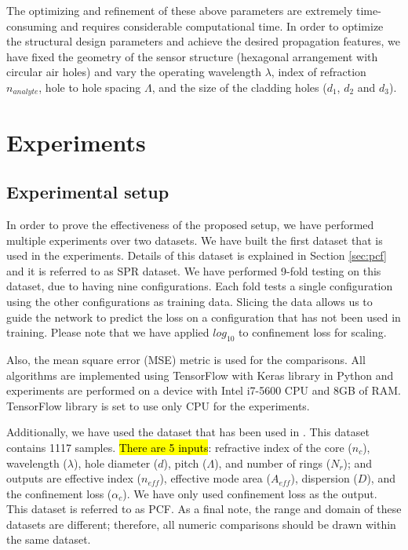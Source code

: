 \documentclass[journal]{IEEEtran}
\begin{document}
The optimizing and refinement of these above parameters are extremely time-consuming and requires considerable computational time. In order to optimize the structural design parameters and achieve the desired propagation features, we have fixed the geometry of the sensor structure (hexagonal arrangement with circular air holes) and vary the operating wavelength $\lambda$, index of refraction $n_{analyte}$, hole to hole spacing $\Lambda$, and the size of the cladding holes ($d_1$, $d_2$ and $d_3$).


\section{Experiments}
\label{sec:exp}

\subsection{Experimental setup}

\def\dszero{PCF}
In order to prove the effectiveness of the proposed setup, we have performed multiple experiments over two datasets. We have built the first dataset that is used in the experiments. Details of this dataset is explained in Section \ref{sec:pcf} and it is referred to as SPR dataset. We have performed 9-fold testing on this dataset, due to having nine configurations. Each fold tests a single configuration using the other configurations as training data. Slicing the data allows us to guide the network to predict the loss on a configuration that has not been used in training. Please note that we have applied $log_{10}$ to confinement loss for scaling.

Also, the mean square error (MSE) metric is used for the comparisons. All algorithms are implemented using TensorFlow with Keras library in Python and experiments are performed on a device with Intel i7-5600 CPU and 8GB of RAM. TensorFlow library is set to use only CPU for the experiments.

Additionally, we have used the dataset that has been used in \cite{paper0}. This dataset contains 1117 samples. \hl{There are 5 inputs}: refractive index of the core ($n_c$), wavelength ($\lambda$), hole diameter ($d$), pitch ($\Lambda$), and number of rings ($N_r$);  and outputs are effective index ($n_{eff}$), effective mode area ($A_{eff}$), dispersion ($D$), and the confinement loss ($\alpha_c$). We have only used confinement loss as the output. This dataset is referred to as PCF. As a final note, the range and domain of these datasets are different; therefore, all numeric comparisons should be drawn within the same dataset.
\end{document}
